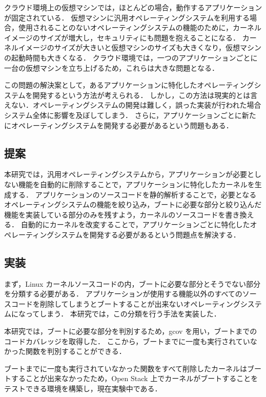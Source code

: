 \documentclass[graduation-thesis]{mlarticle}
\begin{document}
クラウド環境上の仮想マシンでは，ほとんどの場合，動作するアプリケーションが固定されている．
仮想マシンに汎用オペレーティングシステムを利用する場合，使用されることのないオペレーティングシステムの機能のために，カーネルイメージのサイズが増大し，セキュリティにも問題を抱えることになる． 
カーネルイメージのサイズが大きいと仮想マシンのサイズも大きくなり，仮想マシンの起動時間も大きくなる．
クラウド環境では，一つのアプリケーションごとに一台の仮想マシンを立ち上げるため，これらは大きな問題となる．

この問題の解決案として，あるアプリケーションに特化したオペレーティングシステムを開発するという方法が考えられる．
しかし，この方法は現実的とは言えない．オペレーティングシステムの開発は難しく，誤った実装が行われた場合システム全体に影響を及ぼしてしまう．
さらに，アプリケーションごとに新たにオペレーティングシステムを開発する必要があるという問題もある．

\subsection {提案}
\label{intro:proposal}
本研究では，汎用オペレーティングシステムから，アプリケーションが必要としない機能を自動的に削除することで，アプリケーションに特化したカーネルを生成する．
アプリケーションのソースコードを静的解析することで，必要となるオペレーティングシステムの機能を絞り込み，ブートに必要な部分と絞り込んだ機能を実装している部分のみを残すよう，カーネルのソースコードを書き換える．
自動的にカーネルを改変することで，アプリケーションごとに特化したオペレーティングシステムを開発する必要があるという問題点を解決する．

\subsection {実装}
\label{intro:implementation}
まず，Linux カーネルソースコードの内，ブートに必要な部分とそうでない部分を分類する必要がある．
アプリケーションが使用する機能以外のすべてのソースコードを削除してしまうとブートすることが出来ないオペレーティングシステムになってしまう．
本研究では，この分類を行う手法を実装した．

本研究では，ブートに必要な部分を判別するため，gcov を用い，ブートまでのコードカバレッジを取得した．
ここから，ブートまでに一度も実行されていなかった関数を判別することができる．

ブートまでに一度も実行されていなかった関数をすべて削除したカーネルはブートすることが出来なかったため，Open Stack 上でカーネルがブートすることをテストできる環境を構築し，現在実験中である．
\end{document}
